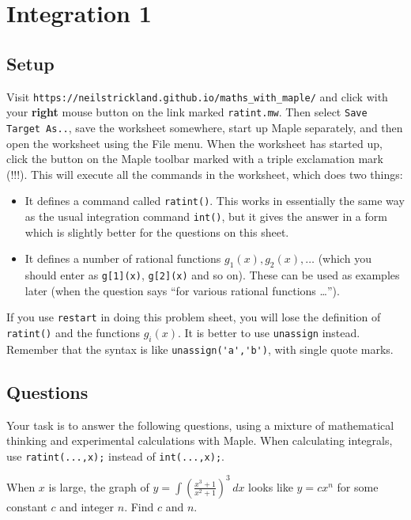 \documentclass[a4paper,10pt]{amsbook}
\begin{document}
\chapter{Integration 1}

\section*{Setup}

Visit \verb~https://neilstrickland.github.io/maths_with_maple/~ and
click with your \textbf{right} mouse button on the link marked
\verb~ratint.mw~.  Then select \verb~Save Target As..~, save the
worksheet somewhere, start up Maple separately, and then open the
worksheet using the File menu.  When the worksheet has started up,
click the button on the Maple toolbar marked with a triple exclamation
mark (!!!).  This will execute all the commands in the worksheet,
which does two things:
\begin{itemize}
 \item[(a)] It defines a command called \verb~ratint()~.
  This works in essentially the same way as the usual
  integration command \verb~int()~, but it gives the answer
  in a form which is slightly better for the questions on
  this sheet.
 \item[(b)] It defines a number of rational functions
  $g_1(x),g_2(x),\dotsc$ (which you should enter as
  \verb~g[1](x)~, \verb~g[2](x)~ and so on).  These can be
  used as examples later (when the question says ``for
  various rational functions \ldots'').
\end{itemize}
If you use \verb~restart~ in doing this problem sheet, you
will lose the definition of \verb~ratint()~ and the
functions $g_i(x)$.  It is better to use \verb~unassign~
instead.  Remember that the syntax is like
\verb~unassign('a','b')~, with single quote marks.

\section*{Questions}

Your task is to answer the following questions, using a
mixture of mathematical thinking and experimental
calculations with Maple.  When calculating integrals, use
\verb~ratint(...,x);~ instead of \verb~int(...,x);~.

\begin{exercise}
 When $x$ is large, the graph of
 $y=\displaystyle\int\left(\frac{x^3+1}{x^2+1}\right)^3\,dx$
 looks like $y=cx^n$ for some constant $c$ and integer $n$.
 Find $c$ and $n$.
\end{exercise}
\end{document}

